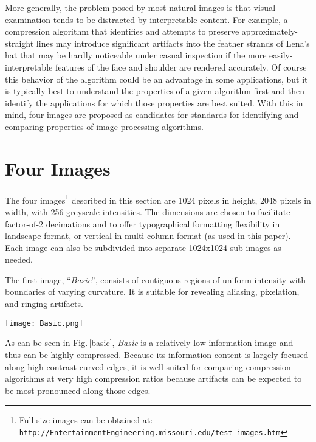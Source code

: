 \documentclass{article}
\begin{document}
More generally, the problem posed by most natural images
is that visual examination tends to be distracted by
interpretable content. For example, a compression
algorithm that identifies and attempts to preserve
approximately-straight lines may introduce significant
artifacts into the feather strands of Lena's hat that may be 
hardly noticeable under casual inspection if the more
easily-interpretable features of the face and shoulder
are rendered accurately. Of course this behavior of 
the algorithm could be an advantage in some applications,
but it is typically best to understand the properties of a
given algorithm first and then identify the applications
for which those properties are best suited. With this
in mind, four images are proposed as
candidates for standards for identifying and comparing
properties of image processing algorithms.

\section{Four Images}

The four images\footnote{Full-size images can be
obtained at: {\tt http://EntertainmentEngineering.missouri.edu/test-images.htm}} described in this section are 1024
pixels in height, 2048 pixels in width, with 256
greyscale intensities. The dimensions are chosen
to facilitate factor-of-2 decimations and to offer
typographical formatting flexibility in landscape
format, or vertical in multi-column format (as used
in this paper). Each 
image can also be subdivided into separate 
1024x1024 sub-images as needed. 

The first image, ``{\em Basic}'', consists of contiguous regions of
uniform intensity with boundaries of varying curvature. It
is suitable for revealing aliasing, pixelation, and ringing artifacts. 
\begin{figure*}
\centering
   \centering
   \texttt{[image: Basic.png]}
\caption{``Basic'' - A simple set of contiguous regions of pure black and pure white.}
\label{basic}
\end{figure*}
As can be seen in Fig.\,\ref{basic}, {\em Basic} is a relatively low-information image and thus can be 
highly compressed. Because its information content is largely
focused along high-contrast curved edges, it is well-suited
for comparing compression algorithms at very high compression ratios
because artifacts can be expected to be most pronounced along
those edges. 
\end{document}
